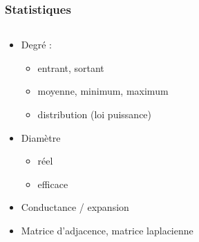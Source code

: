 \documentclass[c]{beamer}
\begin{document}
\begin{frame}
    \frametitle{Statistiques}

    \begin{columns}
        \begin{column}{.6\textwidth}
            \begin{itemize}
                \item<1-> Degré :
                    \begin{itemize}
                        \item entrant, sortant
                        \item moyenne, minimum, maximum
                        \item distribution (loi puissance)
                    \end{itemize}
                \item<2-> Diamètre
                    \begin{itemize}
                        \item réel
                        \item efficace
                    \end{itemize}
                \item<3-> Conductance / expansion
                \item<4-> Matrice d'adjacence, matrice laplacienne
            \end{itemize}
        \end{column}
        \begin{column}{.4\textwidth}
\end{column}
\end{columns}
\end{frame}
\end{document}
